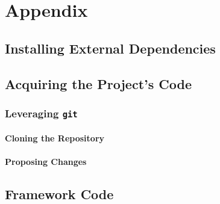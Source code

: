 \chapter{Appendix}
    \section{Installing External Dependencies}
    \section{Acquiring the Project's Code}
        \subsection{Leveraging \texttt{git}}
            \subsubsection{Cloning the Repository}
            \subsubsection{Proposing Changes}
    \section{Framework Code}